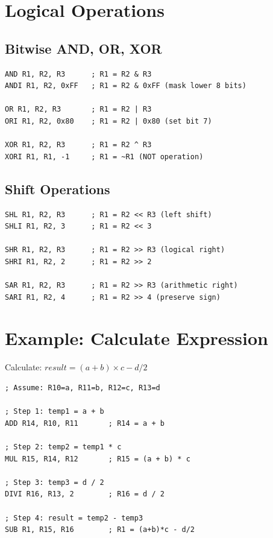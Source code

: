 \documentclass[12pt,a4paper,oneside]{book}
\begin{document}
\section{Logical Operations}

\subsection{Bitwise AND, OR, XOR}

\begin{lstlisting}[style=assembly]
AND R1, R2, R3      ; R1 = R2 & R3
ANDI R1, R2, 0xFF   ; R1 = R2 & 0xFF (mask lower 8 bits)

OR R1, R2, R3       ; R1 = R2 | R3
ORI R1, R2, 0x80    ; R1 = R2 | 0x80 (set bit 7)

XOR R1, R2, R3      ; R1 = R2 ^ R3
XORI R1, R1, -1     ; R1 = ~R1 (NOT operation)
\end{lstlisting}

\subsection{Shift Operations}

\begin{lstlisting}[style=assembly]
SHL R1, R2, R3      ; R1 = R2 << R3 (left shift)
SHLI R1, R2, 3      ; R1 = R2 << 3

SHR R1, R2, R3      ; R1 = R2 >> R3 (logical right)
SHRI R1, R2, 2      ; R1 = R2 >> 2

SAR R1, R2, R3      ; R1 = R2 >> R3 (arithmetic right)
SARI R1, R2, 4      ; R1 = R2 >> 4 (preserve sign)
\end{lstlisting}

\section{Example: Calculate Expression}

Calculate: $result = (a + b) \times c - d / 2$

\begin{lstlisting}[style=assembly, caption={Complex Expression}]
; Assume: R10=a, R11=b, R12=c, R13=d

; Step 1: temp1 = a + b
ADD R14, R10, R11       ; R14 = a + b

; Step 2: temp2 = temp1 * c
MUL R15, R14, R12       ; R15 = (a + b) * c

; Step 3: temp3 = d / 2
DIVI R16, R13, 2        ; R16 = d / 2

; Step 4: result = temp2 - temp3
SUB R1, R15, R16        ; R1 = (a+b)*c - d/2
\end{lstlisting}
\end{document}
